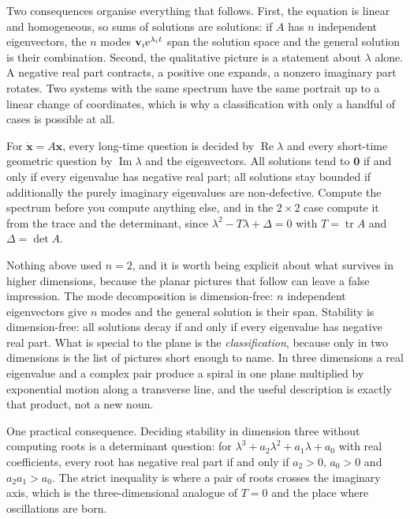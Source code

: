 Two consequences organise everything that follows. First, the equation is linear and homogeneous, so sums of solutions are solutions: if $A$ has $n$ independent eigenvectors, the $n$ modes $\mathbf{v}_i\mathrm{e}^{\lambda_it}$ span the solution space and the general solution is their combination. Second, the qualitative picture is a statement about $\lambda$ alone. A negative real part contracts, a positive one expands, a nonzero imaginary part rotates. Two systems with the same spectrum have the same portrait up to a linear change of coordinates, which is why a classification with only a handful of cases is possible at all.

\begin{keynote}
For $\dot{\mathbf{x}}=A\mathbf{x}$, every long-time question is decided by $\operatorname{Re}\lambda$ and every short-time geometric question by $\operatorname{Im}\lambda$ and the eigenvectors. All solutions tend to $\mathbf{0}$ if and only if every eigenvalue has negative real part; all solutions stay bounded if additionally the purely imaginary eigenvalues are non-defective. Compute the spectrum before you compute anything else, and in the $2\times2$ case compute it from the trace and the determinant, since $\lambda^2-T\lambda+\Delta=0$ with $T=\operatorname{tr}A$ and $\Delta=\det A$.
\end{keynote}

Nothing above used $n=2$, and it is worth being explicit about what survives in higher dimensions, because the planar pictures that follow can leave a false impression. The mode decomposition is dimension-free: $n$ independent eigenvectors give $n$ modes and the general solution is their span. Stability is dimension-free: all solutions decay if and only if every eigenvalue has negative real part. What is special to the plane is the \emph{classification}, because only in two dimensions is the list of pictures short enough to name. In three dimensions a real eigenvalue and a complex pair produce a spiral in one plane multiplied by exponential motion along a transverse line, and the useful description is exactly that product, not a new noun.

One practical consequence. Deciding stability in dimension three without computing roots is a determinant question: for $\lambda^{3}+a_2\lambda^{2}+a_1\lambda+a_0$ with real coefficients, every root has negative real part if and only if $a_2>0$, $a_0>0$ and $a_2a_1>a_0$. The strict inequality is where a pair of roots crosses the imaginary axis, which is the three-dimensional analogue of $T=0$ and the place where oscillations are born.

